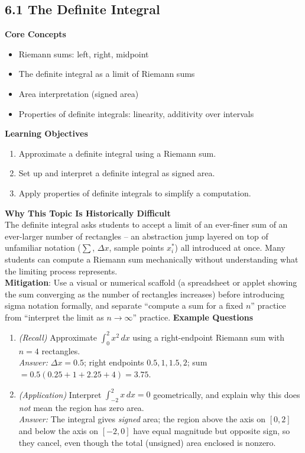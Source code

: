 \documentclass[11pt]{article}
\begin{document}
\subsection{6.1 The Definite Integral}
\textbf{Core Concepts}
\begin{itemize}
\item Riemann sums: left, right, midpoint
\item The definite integral as a limit of Riemann sums
\item Area interpretation (signed area)
\item Properties of definite integrals: linearity, additivity over intervals
\end{itemize}
\textbf{Learning Objectives}
\begin{enumerate}
\item Approximate a definite integral using a Riemann sum.
\item Set up and interpret a definite integral as signed area.
\item Apply properties of definite integrals to simplify a computation.
\end{enumerate}
\textbf{Why This Topic Is Historically Difficult} \\
The definite integral asks students to accept a limit of an ever-finer sum of an ever-larger number of rectangles -- an abstraction jump layered on top of unfamiliar notation ($\sum$, $\Delta x$, sample points $x_i^*$) all introduced at once. Many students can compute a Riemann sum mechanically without understanding what the limiting process represents. \\
\textbf{Mitigation}: Use a visual or numerical scaffold (a spreadsheet or applet showing the sum converging as the number of rectangles increases) before introducing sigma notation formally, and separate ``compute a sum for a fixed $n$'' practice from ``interpret the limit as $n\to\infty$'' practice.
\textbf{Example Questions}
\begin{enumerate}
\item \emph{(Recall)} Approximate $\displaystyle\int_0^2 x^2\,dx$ using a right-endpoint Riemann sum with $n=4$ rectangles. \\
\textit{Answer:} $\Delta x = 0.5$; right endpoints $0.5,1,1.5,2$; sum $=0.5(0.25+1+2.25+4)=3.75$.
\item \emph{(Application)} Interpret $\displaystyle\int_{-2}^{2}x\,dx = 0$ geometrically, and explain why this does \emph{not} mean the region has zero area. \\
\textit{Answer:} The integral gives \emph{signed} area; the region above the axis on $[0,2]$ and below the axis on $[-2,0]$ have equal magnitude but opposite sign, so they cancel, even though the total (unsigned) area enclosed is nonzero.
\end{enumerate}
\end{document}
